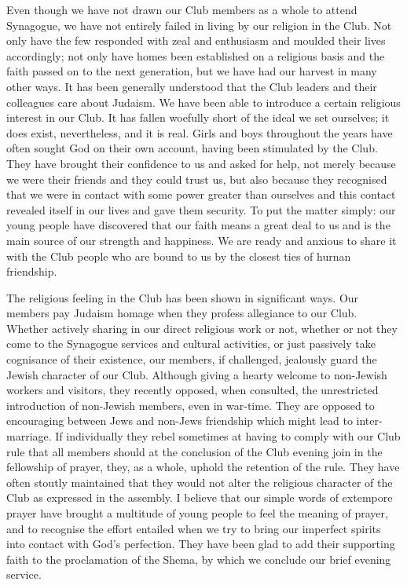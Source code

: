 Even though we have not drawn our Club members as
a whole to attend Synagogue, we have not entirely failed
in living by our religion in the Club. Not only have the
few responded with zeal and enthusiasm and moulded
their lives accordingly; not only have homes been established
on a religious basis and the faith passed on to the
next generation, but we have had our harvest in many
other ways. It has been generally understood that the
Club leaders and their colleagues care about Judaism.
We have been able to introduce a certain religious interest
in our Club. It has fallen woefully short of the ideal we
set ourselves; it does exist, nevertheless, and it is real.
Girls and boys throughout the years have often sought
God on their own account, having been stimulated by the
Club. They have brought their confidence to us and
asked for help, not merely because we were their friends
and they could trust us, but also because they recognised
that we were in contact with some power greater than
ourselves and this contact revealed itself in our lives and
gave them security. To put the matter simply: our
young people have discovered that our faith means a great
deal to us and is the main source of our strength and
happiness. We are ready and anxious to share it with
the Club people who are bound to us by the closest ties of
hurnan friendship.

The religious feeling in the Club has been shown in
significant ways. Our members pay Judaism homage
when they profess allegiance to our Club. Whether
actively sharing in our direct religious work or not,
whether or not they come to the Synagogue services and
cultural activities, or just passively take cognisance of
their existence, our members, if challenged, jealously
guard the Jewish character of our Club. Although giving
a hearty welcome to non-Jewish workers and visitors,
they recently opposed, when consulted, the unrestricted
introduction of non-Jewish members, even in war-time.
They are opposed to encouraging between Jews and
non-Jews friendship which might lead to inter-marriage.
If individually they rebel sometimes at having to
comply with our Club rule that all members should at
the conclusion of the Club evening join in the fellowship
of prayer, they, as a whole, uphold the retention of the
rule. They have often stoutly maintained that they
would not alter the religious character of the Club as
expressed in the assembly. I believe that our simple
words of extempore prayer have brought a multitude of
young people to feel the meaning of prayer, and to recognise
the effort entailed when we try to bring our imperfect
spirits into contact with God’s perfection. They have
been glad to add their supporting faith to the proclamation
of the Shema, by which we conclude our brief evening
service.

